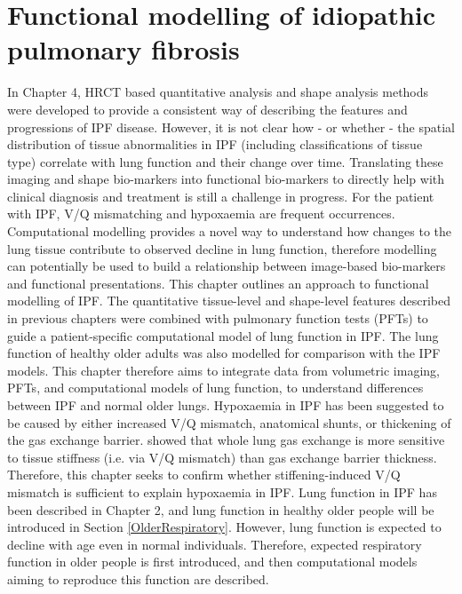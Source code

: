 \chapter{Functional modelling of idiopathic pulmonary fibrosis}\label{Yuwen_ModelBasedAnalysis}
In Chapter 4, HRCT based quantitative analysis and shape analysis methods were developed to provide a consistent way of describing the features and progressions of IPF disease. However, it is not clear how - or whether - the spatial distribution of tissue abnormalities in IPF (including classifications of tissue type) correlate with lung function and their change over time. Translating these imaging and shape bio-markers into functional bio-markers to directly help with clinical diagnosis and treatment is still a challenge in progress. For the patient with IPF, V/Q mismatching and hypoxaemia are frequent occurrences. Computational modelling provides a novel way to understand how changes to the lung tissue contribute to observed decline in lung function, therefore modelling can potentially be used to build a relationship between image-based bio-markers and functional presentations. This chapter outlines an approach to functional modelling of IPF. The quantitative tissue-level and shape-level features described in previous chapters were combined with pulmonary function tests (PFTs) to guide a patient-specific computational model of lung function in IPF. The lung function of healthy older adults was also modelled for comparison with the IPF models. This chapter therefore aims to integrate data from volumetric imaging, PFTs, and computational models of lung function, to understand differences between IPF and normal older lungs. Hypoxaemia in IPF has been suggested to be caused by either increased V/Q mismatch, anatomical shunts, or thickening of the gas exchange barrier. \cite{swan2010multi} showed that whole lung gas exchange is more sensitive to tissue stiffness (i.e. via V/Q mismatch) than gas exchange barrier thickness. Therefore, this chapter seeks to confirm whether stiffening-induced V/Q mismatch is sufficient to explain hypoxaemia in IPF. Lung function in IPF has been described in Chapter 2, and lung function in healthy older people will be introduced in Section \ref{OlderRespiratory}. However, lung function is expected to decline with age even in normal individuals. Therefore, expected respiratory function in older people is first introduced, and then computational models aiming to reproduce this function are described.

